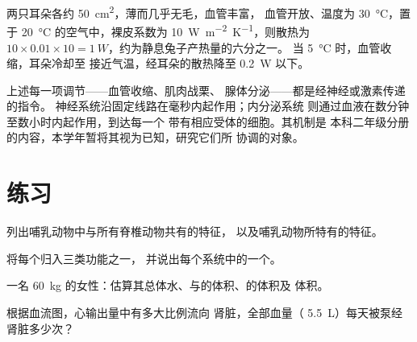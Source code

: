 \begin{example}[兔子的耳朵]\label{ex:b1:mammal-organization:ears}
两只耳朵各约 \qty{50}{cm^2}，薄而几乎无毛，血管丰富，
血管开放、温度为 \qty{30}{\celsius}，置于
\qty{20}{\celsius} 的空气中，裸皮系数为
\qty{10}{W.m^{-2}.K^{-1}}，则散热为 $10\times 0.01\times 10 =
\qty{1}{W}$，约为静息兔子产热量的六分之一。
当 \qty{5}{\celsius} 时，血管收缩，耳朵冷却至
接近气温，经耳朵的散热降至 \qty{0.2}{W} 以下。
\end{example}

\begin{remark}[协调]\label{rem:b1:mammal-organization:coordination}
上述每一项调节——血管收缩、肌肉战栗、
腺体分泌——都是经神经或激素传递的指令。
神经系统沿固定线路在毫秒内起作用；内分泌系统
则通过血液在数分钟至数小时内起作用，到达每一个
带有相应受体的细胞。其机制是
本科二年级分册的内容，本学年暂将其视为已知，研究它们所
协调的对象。
\end{remark}

\section{练习}

\begin{exercise}[$\star$]\label{exo:b1:mammal-organization:1}
列出哺乳动物中与所有脊椎动物共有的特征，
以及哺乳动物所特有的特征。
\end{exercise}

\begin{exercise}[$\star$]\label{exo:b1:mammal-organization:2}
将每个归入三类功能之一，
并说出每个系统中的一个。
\end{exercise}

\begin{exercise}[$\star$]\label{exo:b1:mammal-organization:3}
一名 \qty{60}{kg} 的女性：估算其总体水、与的体积、的体积及
体积。
\end{exercise}

\begin{exercise}[$\star$]\label{exo:b1:mammal-organization:4}
根据血流图，心输出量中有多大比例流向
肾脏，全部血量（
\qty{5.5}{L}）每天被泵经肾脏多少次？
\end{exercise}

